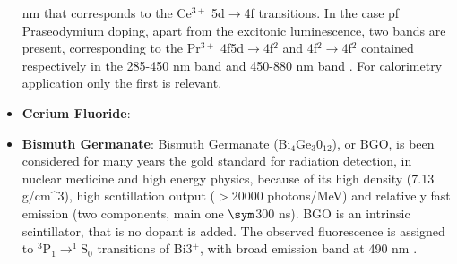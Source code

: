\begin{itemize}
nm that corresponds to the Ce$^{3+}$ 5d$\rightarrow$4f transitions.
In the case pf Praseodymium doping, apart from the excitonic luminescence, two bands are present, corresponding to the Pr$^{3+}$ 4f5d$\rightarrow$4f$^{2}$ and 4f$^{2}\rightarrow$4f$^{2}$ contained respectively in the 285-450 nm band and 450-880 nm band \cite{Drozdowski2008}. For calorimetry application only the first is relevant. 
\item \textbf{Cerium Fluoride}:
\item \textbf{Bismuth Germanate}: Bismuth Germanate (Bi$_{4}$Ge$_{3}$0$_{12}$), or BGO, is been considered for many years the gold standard for radiation detection, in nuclear medicine and high energy physics, because of its high density (7.13 g/cm$\^{3}$), high scntillation output ($>$20000 photons/MeV) and relatively fast emission (two components, main one $\sym$300 ns).
BGO is an intrinsic scintillator, that is no dopant is added. The observed fluorescence is assigned to $^{3}$P$_{1}\rightarrow ^{1}$S$_{0}$ transitions of Bi3$^{+}$, with broad emission band at 490 nm \cite{Weber1996}.
\end{itemize}